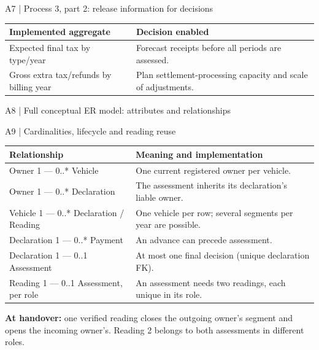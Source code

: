 \begin{frame}{A7 | Process 3, part 2: release information for decisions}
\small
\begin{center}\end{center}
\begin{tabularx}{\textwidth}{@{}p{}X@{}}\toprule
\textbf{Implemented aggregate} & \textbf{Decision enabled}\\\midrule
Expected final tax by type/year & Forecast receipts before all periods are assessed.\\
Gross extra tax/refunds by billing year & Plan settlement-processing capacity and scale of adjustments.\\\bottomrule
\end{tabularx}\par
\epclegend
{}
\end{frame}

\begin{frame}{A8 | Full conceptual ER model: attributes and relationships}
\renewcommand{\erdetail}{1}
\begin{center}\end{center}
\erlegend
{}
\end{frame}

\begin{frame}{A9 | Cardinalities, lifecycle and reading reuse}
\small
\begin{tabularx}{\textwidth}{@{}p{}X@{}}\toprule
\textbf{Relationship} & \textbf{Meaning and implementation}\\\midrule
Owner 1 — 0..* Vehicle & One current registered owner per vehicle.\\
Owner 1 — 0..* Declaration & The assessment inherits its declaration's liable owner.\\
Vehicle 1 — 0..* Declaration / Reading & One vehicle per row; several segments per year are possible.\\
Declaration 1 — 0..* Payment & An advance can precede assessment.\\
Declaration 1 — 0..1 Assessment & At most one final decision (unique declaration FK).\\
Reading 1 — 0..1 Assessment, per role & An assessment needs two readings, each unique in its role.\\\bottomrule
\end{tabularx}\par
\medskip
\textbf{At handover:} one verified reading closes the outgoing owner's segment and opens the incoming owner's. Reading 2 belongs to both assessments in different roles.
\end{frame}


